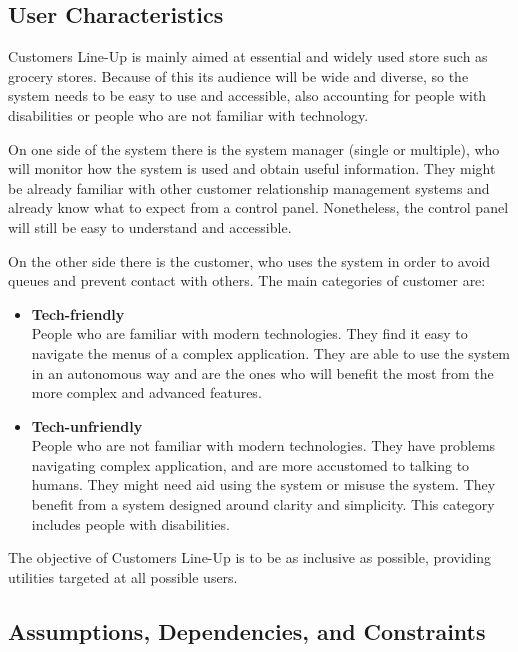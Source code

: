 \subsection{User Characteristics}
Customers Line-Up is mainly aimed at essential and widely used store such as grocery stores.
Because of this its audience will be wide and diverse, so the system needs to be easy to use and accessible, also accounting for people with disabilities or people who are not familiar with technology.

On one side of the system there is the system manager (single or multiple), who will monitor how the system is used and obtain useful information.
They might be already familiar with other customer relationship management systems and already know what to expect from a control panel. Nonetheless, the control panel will still be easy to understand and accessible.

On the other side there is the customer, who uses the system in order to avoid queues and prevent contact with others.
The main categories of customer are:
\begin{itemize}
    \item \textbf{Tech-friendly}\\
        People who are familiar with modern technologies. They find it easy to navigate the menus of a complex application.
        They are able to use the system in an autonomous way and are the ones who will benefit the most from the more complex and advanced features.
    \item \textbf{Tech-unfriendly}\\
        People who are not familiar with modern technologies. They have problems navigating complex application, and are more accustomed to talking to humans.
        They might need aid using the system or misuse the system. They benefit from a system designed around clarity and simplicity.
        This category includes people with disabilities.
\end{itemize}

The objective of Customers Line-Up is to be as inclusive as possible, providing utilities targeted at all possible users.

\subsection{Assumptions, Dependencies, and Constraints}


